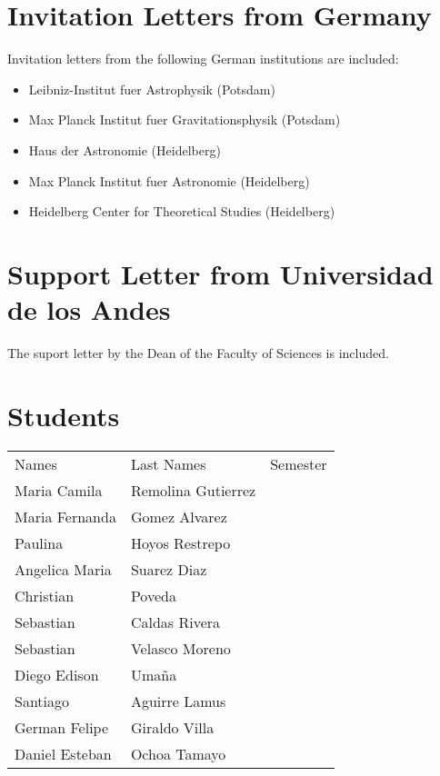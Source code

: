 \documentclass[12pt]{article}
\begin{document}
\section{Invitation Letters from Germany}
Invitation letters from the following German institutions are included:

\begin{itemize}
\item Leibniz-Institut fuer Astrophysik (Potsdam)
\item Max Planck Institut fuer Gravitationsphysik (Potsdam)
\item Haus der Astronomie (Heidelberg)
\item Max Planck Institut fuer Astronomie (Heidelberg)
\item Heidelberg Center for Theoretical Studies (Heidelberg)
\end{itemize}

\section{Support Letter from Universidad de los Andes}
The suport letter by the Dean of the Faculty of Sciences is included.

\section{Students}

\begin{tabular}{lll}
Names & Last Names & Semester \\
Maria Camila & Remolina Gutierrez & \\
Maria Fernanda & Gomez Alvarez & \\ 
Paulina & Hoyos Restrepo& \\
Angelica Maria & Suarez Diaz &\\
Christian & Poveda & \\
Sebastian & Caldas Rivera & \\
Sebastian & Velasco Moreno & \\
Diego Edison & Uma\~na & \\
Santiago & Aguirre Lamus & \\
German Felipe & Giraldo Villa & \\
Daniel Esteban & Ochoa Tamayo & \\
\end{tabular}
\end{document}
